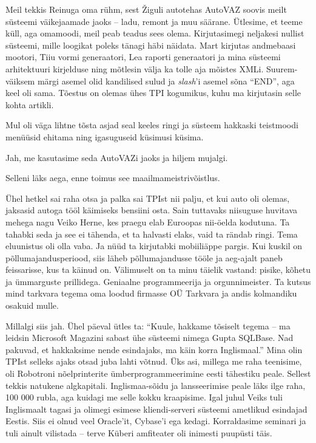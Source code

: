 Meil tekkis 
Reinuga oma rühm, sest Žiguli autotehas AutoVAZ soovis meilt süsteemi väikejaamade jaoks -- 
ladu, remont ja muu säärane. Ütlesime, et teeme küll, aga omamoodi, 
meil peab teadus sees olema. Kirjutasimegi 
neljakesi nullist süsteemi, mille loogikat poleks tänagi häbi näidata. Mart kirjutas 
andmebaasi mootori, Tiiu vormi generaatori, Lea raporti generaatori ja 
mina süsteemi arhitektuuri kirjelduse ning mõtlesin välja ka
tolle aja mõistes XMLi. Suurem-väiksem märgi asemel olid kandilised sulud ja 
\emph{slash}'i asemel sõna \enquote{END}, aga keel oli sama. 
Tõestus on olemas ühes TPI kogumikus, kuhu ma kirjutasin selle kohta artikli. 

Mul oli väga lihtne tõsta asjad seal keeles ringi ja süsteem hakkaski 
teistmoodi menüüsid ehitama ning igasuguseid küsimusi küsima.


Jah, me kasutasime seda AutoVAZi jaoks ja hiljem mujalgi.


Selleni läks aega, enne toimus see
maailmameistrivõistlus. 

Ühel hetkel sai raha otsa ja palka sai 
TPIst nii palju, et kui auto oli olemas, 
jaksasid autoga tööl käimiseks bensiini osta. Sain tuttavaks niisuguse huvitava mehega nagu Veiko 
Herne, kes praegu elab Euroopas nii-öelda kodutuna. Ta tahabki seda ja see 
ei tähenda, et ta halvasti elaks, vaid ta rändab ringi. Tema eluunistus oli olla vaba. Ja nüüd ta kirjutabki mobiiliäppe pargis. Kui kuskil on 
põllumajandusperiood, siis läheb põllumajandusse tööle ja aeg-ajalt paneb 
feissarisse, kus ta käinud on. Välimuselt on ta minu täielik vastand: 
pisike, kõhetu ja ümmarguste prillidega. Geniaalne programmeerija ja orgunnimeister. Ta kutsus mind tarkvara tegema oma loodud firmasse
OÜ Tarkvara ja andis kolmandiku osakuid mulle.


Millalgi siis jah. Ühel päeval ütles ta: \enquote{Kuule, hakkame tõsiselt 
tegema -- ma leidsin Microsoft Magazini sabast ühe süsteemi nimega 
Gupta SQLBase. 
Nad pakuvad, et hakkaksime nende esindajaks, ma käin korra Inglismaal.} Mina 
olin TPIst selleks ajaks otsad juba lahti võtnud. Üks asi, millega me raha 
teenisime, oli Robotroni nõelprinterite ümberprogrammeerimine eesti 
tähestiku peale. Sellest tekkis natukene 
algkapitali. Inglismaa-sõidu ja lansseerimise 
peale läks ilge raha, 100 000 rubla, aga kuidagi me selle kokku 
kraapisime. Igal juhul Veiks tuli Inglismaalt tagasi ja olimegi esimese kliendi-serveri süsteemi ametlikud esindajad Eestis. Siis ei 
olnud veel Oracle'it, Cybase'i ega kedagi. Korraldasime seminari ja tuli ainult 
vilistada -- terve Küberi amfiteater oli inimesti puupüsti täis. 

